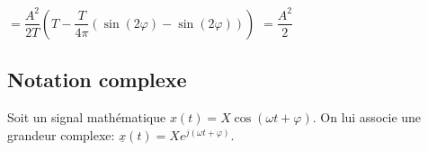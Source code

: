 $ = \dfrac{ A^2}{2 T}\left( T -  \dfrac{T}{4\pi}\left(
\sin\left( 2\varphi\right) - \sin\left( 2 \varphi\right)\right)  \right) $
$ =\dfrac{A^2}{2}$





%
%
%
%
%

\subsection{Notation complexe}

\begin{defi}
Soit un signal mathématique $x(t)=X \cos\left( \omega t + \varphi \right)$. On lui associe 
une grandeur complexe: $\underline{x}(t)=X e^{j\left(\omega t + \varphi\right)}$.
\end{defi}

